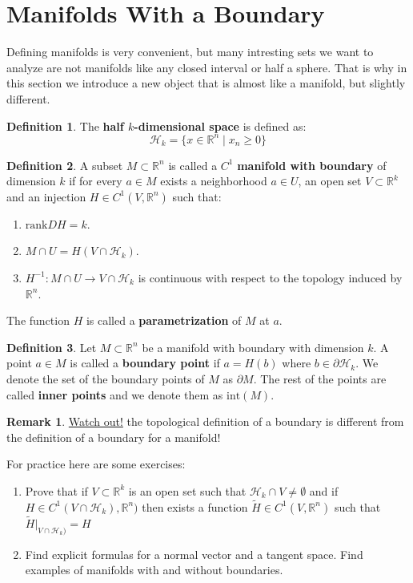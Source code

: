 \documentclass[11pt,a4paper]{article}
\theoremstyle{definition}
\newtheorem{definition}{Definition}[section]
\newtheorem{remark}{Remark}[section]
\theoremstyle{plain}
\newcommand{\R}{\mathbb{R}}
\begin{document}
	\section{Manifolds With a Boundary}
	Defining manifolds is very convenient, but many intresting sets
	we want to analyze are not manifolds like any closed interval or
	half a sphere. That is why in this section we introduce a new object
	that is almost like a manifold, but slightly different.
	\begin{definition}
		The \textbf{half $k$-dimensional space} is defined as:
		\[
			\mathcal{H}_k = \{x \in \R^n \mid x_n \geq 0\}
		\]
	\end{definition}
	\begin{definition}
		A subset $M \subset \R^n$ is called a $C^1$ \textbf{manifold 
		with boundary} of dimension $k$ if for every $a \in M$ exists
		a neighborhood $a \in U$, an open set $V \subset \R^k$ and
		an injection $H \in C^1(V, \R^n)$ such that:
		\begin{enumerate}
			\item $\mathrm{rank}DH = k$.
			\item $M \cap U = H(V \cap \mathcal{H}_k)$.
			\item $H^{-1} \colon M \cap U \to V \cap \mathcal{H}_k$
			is continuous with respect to the topology induced by $\R^n$.
		\end{enumerate}
		The function $H$ is called a \textbf{parametrization} of $M$ at
		$a$.
	\end{definition}
	\begin{definition}
		Let $M \subset \R^n$ be a manifold with boundary with dimension
		$k$. A point $a \in M$ is called a \textbf{boundary point}
		if $a = H(b)$ where $b \in \partial \mathcal{H}_k$. We denote
		the set of the boundary points of $M$ as $\partial M$. The
		rest of the points are called \textbf{inner points} and we denote
		them as $\mathrm{int}(M)$.
	\end{definition}
	\begin{remark}
		\underline{Watch out!} the topological definition of a boundary
		is different from the definition of a boundary for a manifold!
	\end{remark}
	For practice here are some exercises:
	\begin{enumerate}
		\item Prove that if $V \subset \R^k$ is an open set such that
		$\mathcal{H}_k \cap V \neq \emptyset$ and if 
		$H \in C^1(V \cap \mathcal{H}_k), \R^n)$ then exists a function
		$\tilde{H} \in C^1(V, \R^n)$ such that 
		$\tilde{H}\vert_{V \cap \mathcal{H}_k)} = H$
		\item Find explicit formulas for a normal vector and a tangent
		space. Find examples of manifolds with and without boundaries.
	\end{enumerate}
	
\end{document}
